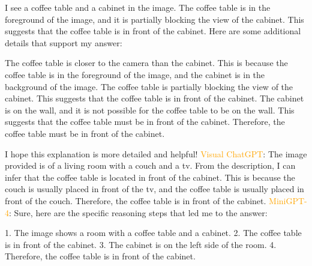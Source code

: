 \begin{enumerate}
    I see a coffee table and a cabinet in the image.
    The coffee table is in the foreground of the image, and it is partially blocking the view of the cabinet.
    This suggests that the coffee table is in front of the cabinet.
    Here are some additional details that support my answer:
    
    The coffee table is closer to the camera than the cabinet. This is because the coffee table is in the foreground of the image, and the cabinet is in the background of the image.
    The coffee table is partially blocking the view of the cabinet. This suggests that the coffee table is in front of the cabinet.
    The cabinet is on the wall, and it is not possible for the coffee table to be on the wall. This suggests that the coffee table must be in front of the cabinet.
    Therefore, the coffee table must be in front of the cabinet.
    
    I hope this explanation is more detailed and helpful! 
    \subitem \textcolor{orange}{Visual ChatGPT}: The image provided is of a living room with a couch and a tv. From the description, I can infer that the coffee table is located in front of the cabinet. This is because the couch is usually placed in front of the tv, and the coffee table is usually placed in front of the couch. Therefore, the coffee table is in front of the cabinet.
    \subitem \textcolor{orange}{MiniGPT-4}: Sure, here are the specific reasoning steps that led me to the answer:

    1. The image shows a room with a coffee table and a cabinet.
    2. The coffee table is in front of the cabinet.
    3. The cabinet is on the left side of the room.
    4. Therefore, the coffee table is in front of the cabinet.
\end{enumerate}
